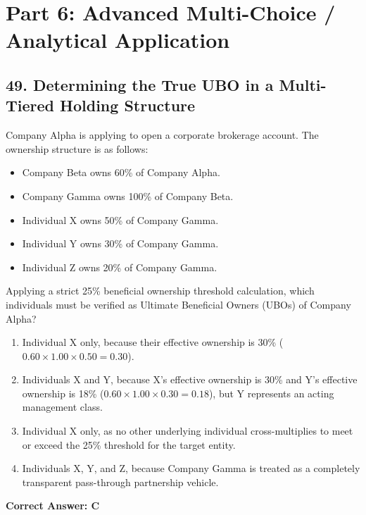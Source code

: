 \documentclass[11pt,a4paper]{article}
\begin{document}
	\newpage
	\section{Part 6: Advanced Multi-Choice / Analytical Application}
	
	\subsection{49. Determining the True UBO in a Multi-Tiered Holding Structure}
	Company Alpha is applying to open a corporate brokerage account. The ownership structure is as follows:
	\begin{itemize}
		\item Company Beta owns 60\% of Company Alpha.
		\item Company Gamma owns 100\% of Company Beta.
		\item Individual X owns 50\% of Company Gamma.
		\item Individual Y owns 30\% of Company Gamma.
		\item Individual Z owns 20\% of Company Gamma.
	\end{itemize}
	Applying a strict 25\% beneficial ownership threshold calculation, which individuals must be verified as Ultimate Beneficial Owners (UBOs) of Company Alpha?
	\begin{enumerate}[label=\Alph*.]
		\item Individual X only, because their effective ownership is 30\% ($0.60 \times 1.00 \times 0.50 = 0.30$).
		\item Individuals X and Y, because X's effective ownership is 30\% and Y's effective ownership is 18\% ($0.60 \times 1.00 \times 0.30 = 0.18$), but Y represents an acting management class.
		\item Individual X only, as no other underlying individual cross-multiplies to meet or exceed the 25\% threshold for the target entity.
		\item Individuals X, Y, and Z, because Company Gamma is treated as a completely transparent pass-through partnership vehicle.
	\end{enumerate}
	\textbf{Correct Answer: C}
	
\end{document}
